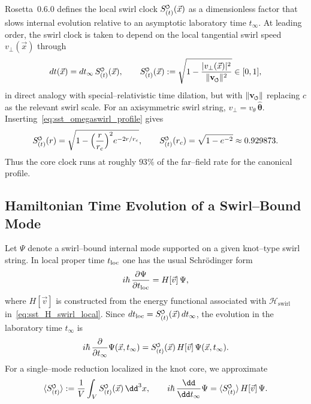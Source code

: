 \documentclass[11pt]{article}
\newcommand{\swirlarrow}{\mkern-2mu\scriptscriptstyle\boldsymbol{\circlearrowleft}}
\newcommand{\SwirlClock}{S_{(t)}^{\swirlarrow}}
\newcommand{\vnorm}{\lVert \mathbf{v}_{\mkern-2mu\scriptscriptstyle\boldsymbol{\circlearrowleft}} \rVert}               %
\newcommand{\rc}{r_c}                                    %
\begin{document}
        Rosetta~0.6.0 defines the local swirl clock \(\SwirlClock(\vec{x})\) as a dimensionless factor that slows internal evolution relative to an asymptotic laboratory time \(t_\infty\). At leading order, the swirl clock is taken to depend on the local tangential swirl speed \(v_\perp(\vec{x})\) through
        \begin{equation}
            dt(\vec{x})
            =
            dt_\infty\,\SwirlClock(\vec{x}),
            \qquad
            \SwirlClock(\vec{x})
            :=
            \sqrt{1-\frac{|v_\perp(\vec{x})|^{2}}{\vnorm^{2}}}
            \in [0,1],
            \label{eq:sst_time_dilation_velocity}
        \end{equation}
        in direct analogy with special–relativistic time dilation, but with \(\vnorm\) replacing \(c\) as the relevant swirl scale. For an axisymmetric swirl string, \(v_\perp = v_\theta\,\hat{\bm{\theta}}\). Inserting~\eqref{eq:sst_omegaswirl_profile} gives
        \begin{equation}
            \SwirlClock(r)
            =
            \sqrt{
                1-\Big(\frac{r}{\rc}\Big)^{2}e^{-2r/\rc}
            },
            \qquad
            \SwirlClock(\rc)
            =
            \sqrt{1-e^{-2}}
            \approx 0.929873.
        \end{equation}
        Thus the core clock runs at roughly \(93\%\) of the far–field rate for the canonical profile.

    \subsection{Hamiltonian Time Evolution of a Swirl–Bound Mode}
        \label{subsec:sst_ham_evolution}

        Let \(\Psi\) denote a swirl–bound internal mode supported on a given knot–type swirl string. In local proper time \(t_{\rm loc}\) one has the usual Schr\"odinger form
        \begin{equation}
            i\hbar\,\frac{\partial \Psi}{\partial t_{\rm loc}}
            =
            H[\vec{v}]\,\Psi,
        \end{equation}
        where \(H[\vec{v}]\) is constructed from the energy functional associated with \(\mathcal{H}_{\text{swirl}}\) in~\eqref{eq:sst_H_swirl_local}. Since \(dt_{\rm loc}=\SwirlClock(\vec{x})\,dt_\infty\), the evolution in the laboratory time \(t_\infty\) is
        \begin{equation}
            i\hbar\,\frac{\partial}{\partial t_\infty}\Psi(\vec{x},t_\infty)
            =
            \SwirlClock(\vec{x})\,H[\vec{v}]\,\Psi(\vec{x},t_\infty).
            \label{eq:sst_lab_schrodinger}
        \end{equation}
        For a single–mode reduction localized in the knot core, we approximate
        \begin{equation}
            \langle \SwirlClock \rangle
            :=
            \frac{1}{V}\int_V \SwirlClock(\vec{x})\,\dd^3x,
            \qquad
            i\hbar\,\frac{\dd}{\dd t_\infty}\Psi
            =
            \langle\SwirlClock\rangle\,H[\vec{v}]\,\Psi.
        \end{equation}
\end{document}

